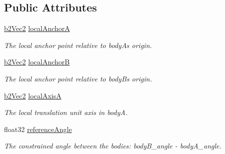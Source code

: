 \subsection*{Public Attributes}
\begin{DoxyCompactItemize}
\item 
\mbox{\label{structb2_prismatic_joint_def_abb51df8daff7a55f47adc83e4f7fa5b9}} 
\hyperlink{structb2_vec2}{b2\+Vec2} \hyperlink{structb2_prismatic_joint_def_abb51df8daff7a55f47adc83e4f7fa5b9}{local\+AnchorA}
\begin{DoxyCompactList}\small\item\em The local anchor point relative to bodyA\textquotesingle{}s origin. \end{DoxyCompactList}\item 
\mbox{\label{structb2_prismatic_joint_def_a5acc1f2f14d1b659fc9d804ab1baf4a3}} 
\hyperlink{structb2_vec2}{b2\+Vec2} \hyperlink{structb2_prismatic_joint_def_a5acc1f2f14d1b659fc9d804ab1baf4a3}{local\+AnchorB}
\begin{DoxyCompactList}\small\item\em The local anchor point relative to bodyB\textquotesingle{}s origin. \end{DoxyCompactList}\item 
\mbox{\label{structb2_prismatic_joint_def_af36fdbcedca5a392a2649cd235c42676}} 
\hyperlink{structb2_vec2}{b2\+Vec2} \hyperlink{structb2_prismatic_joint_def_af36fdbcedca5a392a2649cd235c42676}{local\+AxisA}
\begin{DoxyCompactList}\small\item\em The local translation unit axis in bodyA. \end{DoxyCompactList}\item 
\mbox{\label{structb2_prismatic_joint_def_aa84b43d08e6e11b4daa0c86f46094463}} 
float32 \hyperlink{structb2_prismatic_joint_def_aa84b43d08e6e11b4daa0c86f46094463}{reference\+Angle}
\begin{DoxyCompactList}\small\item\em The constrained angle between the bodies\+: body\+B\+\_\+angle -\/ body\+A\+\_\+angle. \end{DoxyCompactList}\item 
\mbox{\label{structb2_prismatic_joint_def_aa61a03b68caac62a5cf66354f6756eae}} 

\end{DoxyCompactItemize}
